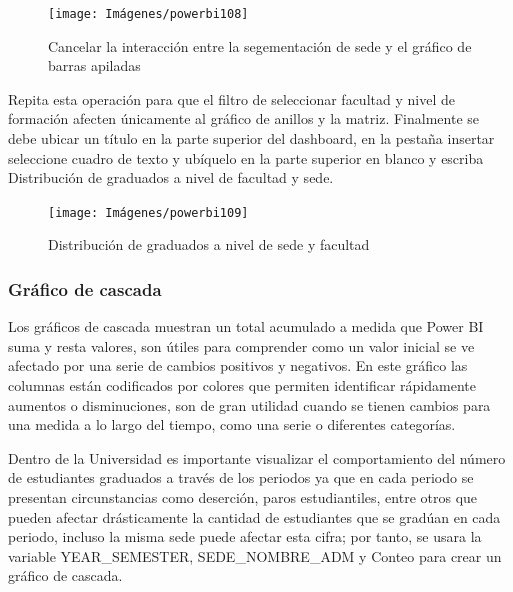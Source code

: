 \documentclass[
]{book}
\begin{document}
\begin{figure}

{\centering \texttt{[image: Imágenes/powerbi108]} 

}

\caption{Cancelar la interacción entre la segementación de  sede y el gráfico de barras apiladas}\label{fig:editarinteraccionessedeybarrasapiladassede-fig}
\end{figure}

Repita esta operación para que el filtro de seleccionar facultad y nivel de formación afecten únicamente al gráfico de anillos y la matriz. Finalmente se debe ubicar un título en la parte superior del dashboard, en la pestaña insertar seleccione cuadro de texto y ubíquelo en la parte superior en blanco y escriba Distribución de graduados a nivel de facultad y sede.

\begin{figure}

{\centering \texttt{[image: Imágenes/powerbi109]} 

}

\caption{Distribución de graduados a nivel de sede y facultad}\label{fig:tablerodistribucuondegraduadossedeyfacultad-fig}
\end{figure}

\hypertarget{graficocascada}{%
\subsubsection{Gráfico de cascada}\label{graficocascada}}

Los gráficos de cascada muestran un total acumulado a medida que Power BI suma y resta valores, son útiles para comprender como un valor inicial se ve afectado por una serie de cambios positivos y negativos. En este gráfico las columnas están codificados por colores que permiten identificar rápidamente aumentos o disminuciones, son de gran utilidad cuando se tienen cambios para una medida a lo largo del tiempo, como una serie o diferentes categorías.

Dentro de la Universidad es importante visualizar el comportamiento del número de estudiantes graduados a través de los periodos ya que en cada periodo se presentan circunstancias como deserción, paros estudiantiles, entre otros que pueden afectar drásticamente la cantidad de estudiantes que se gradúan en cada periodo, incluso la misma sede puede afectar esta cifra; por tanto, se usara la variable YEAR\_SEMESTER, SEDE\_NOMBRE\_ADM y Conteo para crear un gráfico de cascada.
\end{document}
